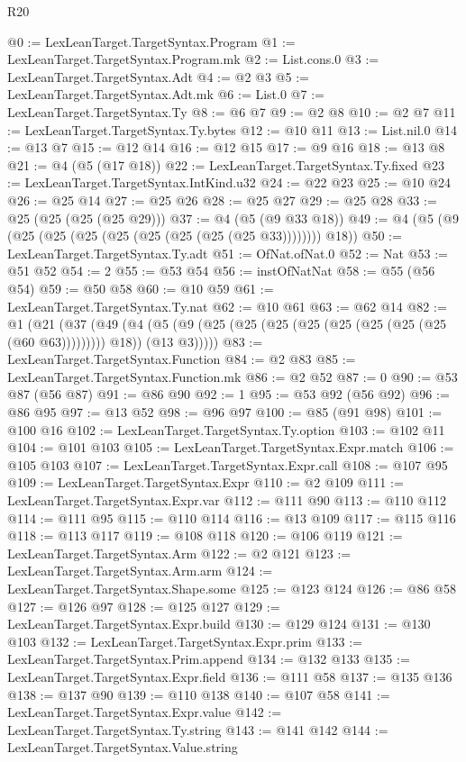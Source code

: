 \begin{lexlean}{R20}
\begin{coremodule}
@0 := LexLeanTarget.TargetSyntax.Program
@1 := LexLeanTarget.TargetSyntax.Program.mk
@2 := List.cons.{0}
@3 := LexLeanTarget.TargetSyntax.Adt
@4 := @2 @3
@5 := LexLeanTarget.TargetSyntax.Adt.mk
@6 := List.{0}
@7 := LexLeanTarget.TargetSyntax.Ty
@8 := @6 @7
@9 := @2 @8
@10 := @2 @7
@11 := LexLeanTarget.TargetSyntax.Ty.bytes
@12 := @10 @11
@13 := List.nil.{0}
@14 := @13 @7
@15 := @12 @14
@16 := @12 @15
@17 := @9 @16
@18 := @13 @8
@21 := @4 (@5 (@17 @18))
@22 := LexLeanTarget.TargetSyntax.Ty.fixed
@23 := LexLeanTarget.TargetSyntax.IntKind.u32
@24 := @22 @23
@25 := @10 @24
@26 := @25 @14
@27 := @25 @26
@28 := @25 @27
@29 := @25 @28
@33 := @25 (@25 (@25 (@25 @29)))
@37 := @4 (@5 (@9 @33 @18))
@49 := @4 (@5 (@9 (@25 (@25 (@25 (@25 (@25 (@25 (@25 (@25 @33)))))))) @18))
@50 := LexLeanTarget.TargetSyntax.Ty.adt
@51 := OfNat.ofNat.{0}
@52 := Nat
@53 := @51 @52
@54 := 2
@55 := @53 @54
@56 := instOfNatNat
@58 := @55 (@56 @54)
@59 := @50 @58
@60 := @10 @59
@61 := LexLeanTarget.TargetSyntax.Ty.nat
@62 := @10 @61
@63 := @62 @14
@82 := @1
    (@21
      (@37
        (@49
          (@4 (@5 (@9 (@25 (@25 (@25 (@25 (@25 (@25 (@25 (@25 (@60 @63))))))))) @18)) (@13 @3)))))
@83 := LexLeanTarget.TargetSyntax.Function
@84 := @2 @83
@85 := LexLeanTarget.TargetSyntax.Function.mk
@86 := @2 @52
@87 := 0
@90 := @53 @87 (@56 @87)
@91 := @86 @90
@92 := 1
@95 := @53 @92 (@56 @92)
@96 := @86 @95
@97 := @13 @52
@98 := @96 @97
@100 := @85 (@91 @98)
@101 := @100 @16
@102 := LexLeanTarget.TargetSyntax.Ty.option
@103 := @102 @11
@104 := @101 @103
@105 := LexLeanTarget.TargetSyntax.Expr.match
@106 := @105 @103
@107 := LexLeanTarget.TargetSyntax.Expr.call
@108 := @107 @95
@109 := LexLeanTarget.TargetSyntax.Expr
@110 := @2 @109
@111 := LexLeanTarget.TargetSyntax.Expr.var
@112 := @111 @90
@113 := @110 @112
@114 := @111 @95
@115 := @110 @114
@116 := @13 @109
@117 := @115 @116
@118 := @113 @117
@119 := @108 @118
@120 := @106 @119
@121 := LexLeanTarget.TargetSyntax.Arm
@122 := @2 @121
@123 := LexLeanTarget.TargetSyntax.Arm.arm
@124 := LexLeanTarget.TargetSyntax.Shape.some
@125 := @123 @124
@126 := @86 @58
@127 := @126 @97
@128 := @125 @127
@129 := LexLeanTarget.TargetSyntax.Expr.build
@130 := @129 @124
@131 := @130 @103
@132 := LexLeanTarget.TargetSyntax.Expr.prim
@133 := LexLeanTarget.TargetSyntax.Prim.append
@134 := @132 @133
@135 := LexLeanTarget.TargetSyntax.Expr.field
@136 := @111 @58
@137 := @135 @136
@138 := @137 @90
@139 := @110 @138
@140 := @107 @58
@141 := LexLeanTarget.TargetSyntax.Expr.value
@142 := LexLeanTarget.TargetSyntax.Ty.string
@143 := @141 @142
@144 := LexLeanTarget.TargetSyntax.Value.string

\end{coremodule}
\end{lexlean}
